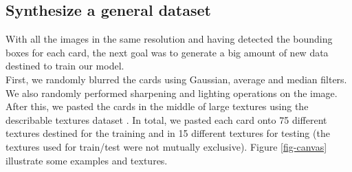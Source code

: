 \documentclass[a4paper]{article}
\begin{document}
\subsection*{Synthesize a general dataset}
With all the images in the same resolution and having detected the bounding boxes for each card, the next goal was to generate a big amount of new data destined to train our model. \\
First, we randomly blurred the cards using Gaussian, average and median filters.  We also randomly performed sharpening and lighting operations on the image.  After this, we pasted the cards in the middle of large textures using the describable textures dataset \cite{cimpoi14describing}.
In total, we pasted each card onto 75 different textures destined for the training and in 15 different textures for testing (the textures used for train/test were not mutually exclusive).  Figure \ref{fig-canvas} illustrate some examples and textures. \\ \\
\end{document}
